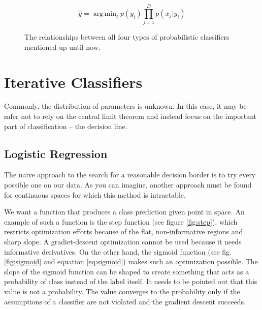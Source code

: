 \documentclass{article}
\DeclareMathOperator*{\argmin}{arg\,min}
\begin{document}
\begin{equation}
    \hat{y} = \argmin_i p(y_i) \prod_{j=1}^D p(x_j | y_i)
    \label{eq:general_bayes}
\end{equation}


\begin{figure}[h]
    \centering
    \caption{ The relationships between all four types of probabilistic classifiers mentioned up until now. }
\end{figure}

\newpage
\section{Iterative Classifiers}
Commonly, the distribution of parameters is unknown. In this case, it may be safer not to rely on the central limit theorem and instead focus on the important part of classification -- the decision line.


\subsection{Logistic Regression}
The naive approach to the search for a reasonable decision border is to try every possible one on our data. 
As you can imagine, another approach must be found for continuous spaces for which this method is intractable.

We want a function that produces a class prediction given point in space. 
An example of such a function is the step function (see figure \ref{fig:step}), which restricts optimization efforts because of the flat, non-informative regions and sharp slope. 
A gradiet-descent optimization cannot be used because it needs informative derivatives. 
On the other hand, the sigmoid function (see fig. \ref{fig:sigmoid} and equation \ref{eq:sigmoid}) makes such an optimization possible.
The slope of the sigmoid function can be shaped to create something that acts as a probability of class instead of the label itself. 
It needs to be pointed out that this value is not a probability. 
The value converges to the probability only if the assumptions of a classifier are not violated and the gradient descent succeeds.
\end{document}
